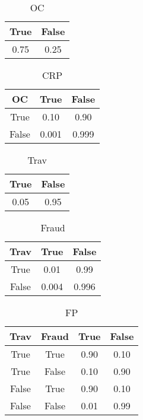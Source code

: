 \documentclass{article}
\begin{document}
	\begin{table}[h!]
		\begin{center}
			\caption{OC}
				\begin{tabular}{c|c}
				\textbf{True} & \textbf{False}\\
				\hline
				0.75 & 0.25\\
				\end{tabular}
		\end{center}
	\end{table}

	\begin{table}[h!]
		\begin{center}
			\caption{CRP}
				\begin{tabular}{c|c|c}
				\textbf{OC} & \textbf{True} & \textbf{False}\\
				\hline
				True & 0.10 & 0.90\\
				False & 0.001 & 0.999\\
				\end{tabular}
		\end{center}
	\end{table}

	\begin{table}[h!]
		\begin{center}
			\caption{Trav}
				\begin{tabular}{c|c}
				\textbf{True} & \textbf{False}\\
				\hline
				0.05 & 0.95\\
				\end{tabular}
		\end{center}
	\end{table}

	\begin{table}[h!]
		\begin{center}
			\caption{Fraud}
				\begin{tabular}{c|c|c}
				\textbf{Trav} & \textbf{True} & \textbf{False}\\
				\hline
				True & 0.01 & 0.99\\
				False & 0.004 & 0.996\\
				\end{tabular}
		\end{center}
	\end{table}

	\begin{table}[h!]
		\begin{center}
			\caption{FP}
				\begin{tabular}{c|c|c|c}
				\textbf{Trav} & \textbf{Fraud} & \textbf{True} & \textbf{False}\\
				\hline
				True & True & 0.90 & 0.10\\
				True & False & 0.10 & 0.90\\
				False & True & 0.90 & 0.10\\
				False & False & 0.01 & 0.99\\
				\end{tabular}
		\end{center}
	\end{table}
\end{document}
